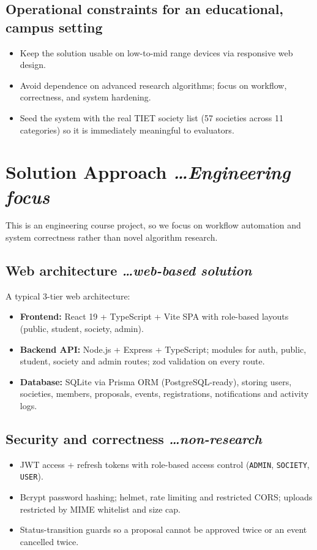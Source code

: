 \documentclass[11pt,a4paper]{article}
\newcommand{\BvrHint}[1]{%
  {\normalfont\normalsize\itshape\hfill #1}}
\begin{document}
\subsection{Operational constraints for an educational, campus setting}
\begin{itemize}[leftmargin=0.7cm]
    \item Keep the solution usable on low-to-mid range
      devices via responsive web design.
    \item Avoid dependence on advanced research
      algorithms; focus on workflow, correctness, and
      system hardening.
    \item Seed the system with the real TIET society list
      (57 societies across 11 categories) so it is
      immediately meaningful to evaluators.
\end{itemize}

\section{Solution Approach %
\BvrHint{\ldots Engineering focus}}
This is an engineering course project, so we focus on
workflow automation and system correctness rather than
novel algorithm research.

\subsection{Web architecture %
\BvrHint{\ldots web-based solution}}
A typical 3-tier web architecture:
\begin{itemize}[leftmargin=0.7cm]
    \item \textbf{Frontend:} React 19 + TypeScript + Vite
      SPA with role-based layouts (public, student,
      society, admin).
    \item \textbf{Backend API:} Node.js + Express +
      TypeScript; modules for auth, public, student,
      society and admin routes; zod validation on every
      route.
    \item \textbf{Database:} SQLite via Prisma ORM
      (PostgreSQL-ready), storing users, societies,
      members, proposals, events, registrations,
      notifications and activity logs.
\end{itemize}

\subsection{Security and correctness %
\BvrHint{\ldots non-research}}
\begin{itemize}[leftmargin=0.7cm]
    \item JWT access + refresh tokens with role-based
      access control (\texttt{ADMIN}, \texttt{SOCIETY},
      \texttt{USER}).
    \item Bcrypt password hashing; helmet, rate limiting
      and restricted CORS; uploads restricted by MIME
      whitelist and size cap.
    \item Status-transition guards so a proposal cannot
      be approved twice or an event cancelled twice.
\end{itemize}
\end{document}
